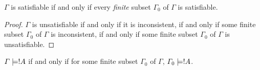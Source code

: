 \documentclass[../../include/open-logic-section]{subfiles}
\begin{document}
\begin{prop}  
$\Gamma$ is satisfiable if and only if every \emph{finite} subset
$\Gamma_0$ of $\Gamma$ is satisfiable. 
\end{prop}

\begin{proof} 
$\Gamma$ is unsatisfiable if and only if it is inconsistent, if and
  only if some finite subset $\Gamma_0$ of $\Gamma$ is inconsistent,
  if and only if some finite subset $\Gamma_0$ of $\Gamma$ is
  unsatisfiable.
\end{proof}

\begin{cor} 
$\Gamma \Entails !A$ if and only if for some finite subset
$\Gamma_0$ of $\Gamma$, $\Gamma_0 \Entails !A$. 
\end{cor} 
\end{document}
